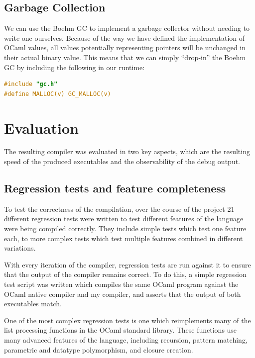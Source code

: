 \documentclass[12pt,a4paper,twoside,openright]{report}
\begin{document}
\section{Garbage Collection} \label{gc}

We can use the Boehm GC to implement a garbage collector without needing to
write one ourselves. Because of the way we have defined the implementation of
OCaml values, all values potentially representing pointers will be unchanged in
their actual binary value. This means that we can simply ``drop-in'' the Boehm
GC by including the following in our runtime:

\begin{lstlisting}[language=C]
#include "gc.h"
#define MALLOC(v) GC_MALLOC(v)
\end{lstlisting}

\chapter{Evaluation}

The resulting compiler was evaluated in two key aspects, which are the 
resulting speed of the produced executables and the observability of the debug 
output.

\section{Regression tests and feature completeness}

To test the correctness of the compilation, over the course of the project 21 
different regression tests were written to test different features of the 
language were being compiled correctly. They include simple tests which test 
one feature each, to more complex tests which test multiple features combined 
in different variations.

With every iteration of the compiler, regression tests are run against it to 
ensure that the output of the compiler remains correct. To do this, a simple 
regression test script was written which compiles the same OCaml program 
against the OCaml native compiler and my compiler, and asserts that the output 
of both executables match.

One of the most complex regression tests is one which reimplements many of the 
list processing functions in the OCaml standard library. These functions use 
many advanced features of the language, including recursion, pattern matching, 
parametric and datatype polymorphism, and closure creation.
\end{document}
